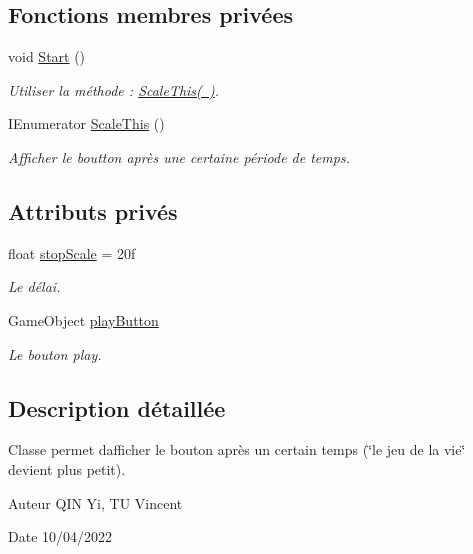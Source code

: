 \subsection*{Fonctions membres privées}
\begin{DoxyCompactItemize}
\item 
void \mbox{\hyperlink{class_text_change_a2c9022c92c5bc0756fe5c8196b309b38}{Start}} ()
\begin{DoxyCompactList}\small\item\em Utiliser la méthode \+: \mbox{\hyperlink{class_text_change_a4fa76be59683626a930fc35f76a9c203}{Scale\+This( )}}. \end{DoxyCompactList}\item 
I\+Enumerator \mbox{\hyperlink{class_text_change_a4fa76be59683626a930fc35f76a9c203}{Scale\+This}} ()
\begin{DoxyCompactList}\small\item\em Afficher le boutton après une certaine période de temps. \end{DoxyCompactList}\end{DoxyCompactItemize}
\subsection*{Attributs privés}
\begin{DoxyCompactItemize}
\item 
float \mbox{\hyperlink{class_text_change_a84ee21ec41dff49dfe0afed07f2c6988}{stop\+Scale}} = 20f
\begin{DoxyCompactList}\small\item\em Le délai. \end{DoxyCompactList}\item 
Game\+Object \mbox{\hyperlink{class_text_change_a2db3747c923cba0a53f035fc0c536ee2}{play\+Button}}
\begin{DoxyCompactList}\small\item\em Le bouton play. \end{DoxyCompactList}\end{DoxyCompactItemize}


\subsection{Description détaillée}
Classe permet d\textquotesingle{}afficher le bouton après un certain temps (\char`\"{}le jeu de la vie\char`\"{} devient plus petit). 

\begin{DoxyAuthor}{Auteur}
Q\+IN Yi, TU Vincent 
\end{DoxyAuthor}
\begin{DoxyDate}{Date}
10/04/2022 
\end{DoxyDate}


